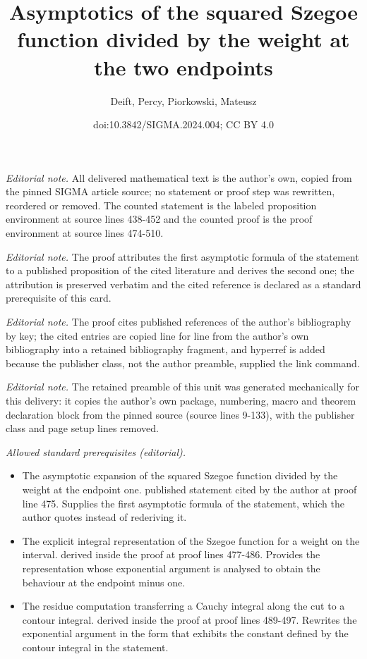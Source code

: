 \documentclass[10pt,a4paper]{amsart}
\title{Asymptotics of the squared Szegoe function divided by the weight at the two endpoints}
\author{Deift, Percy, Piorkowski, Mateusz}
\date{doi:10.3842/SIGMA.2024.004; CC BY 4.0}
\numberwithin{equation}{section}
\begin{document}
\maketitle
\setcounter{section}{2}
\setcounter{Theorem}{1}
\noindent\textit{Editorial note.} All delivered mathematical text is the author's own, copied from the pinned SIGMA article source; no statement or proof step was rewritten, reordered or removed. The counted statement is the labeled proposition environment at source lines 438-452 and the counted proof is the proof environment at source lines 474-510.\par\medskip
\noindent\textit{Editorial note.} The proof attributes the first asymptotic formula of the statement to a published proposition of the cited literature and derives the second one; the attribution is preserved verbatim and the cited reference is declared as a standard prerequisite of this card.\par\medskip
\noindent\textit{Editorial note.} The proof cites published references of the author's bibliography by key; the cited entries are copied line for line from the author's own bibliography into a retained bibliography fragment, and hyperref is added because the publisher class, not the author preamble, supplied the link command.\par\medskip
\noindent\textit{Editorial note.} The retained preamble of this unit was generated mechanically for this delivery: it copies the author's own package, numbering, macro and theorem declaration block from the pinned source (source lines 9-133), with the publisher class and page setup lines removed.\par\medskip
\noindent\textit{Allowed standard prerequisites (editorial).}\begin{itemize}
\item The asymptotic expansion of the squared Szegoe function divided by the weight at the endpoint one. published statement cited by the author at proof line 475. Supplies the first asymptotic formula of the statement, which the author quotes instead of rederiving it.
\item The explicit integral representation of the Szegoe function for a weight on the interval. derived inside the proof at proof lines 477-486. Provides the representation whose exponential argument is analysed to obtain the behaviour at the endpoint minus one.
\item The residue computation transferring a Cauchy integral along the cut to a contour integral. derived inside the proof at proof lines 489-497. Rewrites the exponential argument in the form that exhibits the constant defined by the contour integral in the statement.
\end{itemize}\medskip
\end{document}
